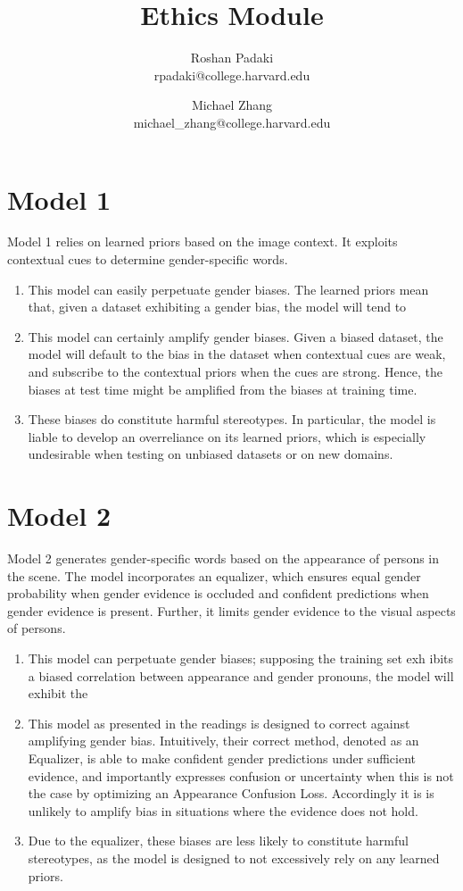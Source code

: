 \documentclass[11pt]{article}
\title{Ethics Module}
\author{Roshan Padaki \\ rpadaki@college.harvard.edu \and Michael Zhang \\ michael\_zhang@college.harvard.edu }
\begin{document}
\maketitle{}

\section{Model 1}
Model 1 relies on learned priors based on the image context. It exploits contextual cues to determine gender-specific words.

\begin{enumerate}[label={(\upshape\alph*)}]
    \item This model can easily perpetuate gender biases. The learned priors mean that, given a dataset exhibiting a gender bias, the model will tend to
    \item This model can certainly amplify gender biases. Given a biased dataset, the model will default to the bias in the dataset when contextual cues are weak, and subscribe to the contextual priors when the cues are strong. Hence, the biases at test time might be amplified from the biases at training time.
    \item These biases do constitute harmful stereotypes. In particular, the model is liable to develop an overreliance on its learned priors, which is especially undesirable when testing on unbiased datasets or on new domains.
\end{enumerate}
\section{Model 2}
Model 2 generates gender-specific words based on the appearance of persons in the scene. The model incorporates an equalizer, which ensures equal gender probability when gender evidence is occluded and confident predictions when gender evidence is present. Further, it limits gender evidence to the visual aspects of persons.


\begin{enumerate}[label={(\upshape\alph*)}]
    \item This model can perpetuate gender biases; supposing the training set exh
    ibits a biased correlation between appearance and gender pronouns, the model will exhibit the
    
    \item This model as presented in the readings is designed to correct against amplifying gender bias. Intuitively, their correct method, denoted as an Equalizer, is able to make confident gender predictions under sufficient evidence, and importantly expresses confusion or uncertainty when this is not the case by optimizing an Appearance Confusion Loss. Accordingly it is is unlikely to amplify bias in situations where the evidence does not hold.

    \item Due to the equalizer, these biases are less likely to constitute harmful stereotypes, as the model is designed to not excessively rely on any learned priors.
\end{enumerate}
\end{document}

